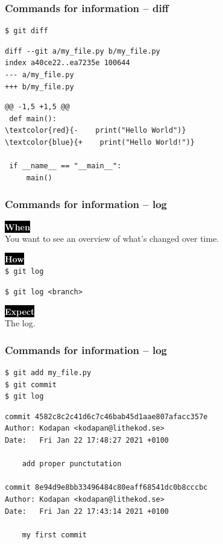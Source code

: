 \documentclass{beamer}
\newcommand{\keyword}[1]{\hspace{-1.0em}\colorbox{black}{\textcolor{white}{\textbf{#1}\vphantom{Ep}}}\vspace{0.2em}} %
\begin{document}
\begin{frame}[fragile]
  \frametitle{Commands for information -- diff}

\begin{verbatim}
$ git diff
\end{verbatim}
\pause{}
\vspace{-2.4ex}
{
\color{gray}
\begin{Verbatim}[commandchars=\\\{\}]
diff --git a/my_file.py b/my_file.py
index a40ce22..ea7235e 100644
--- a/my_file.py
+++ b/my_file.py
\end{Verbatim}
}
\pause{}
\begin{Verbatim}[commandchars=\\\{\}]
@@ -1,5 +1,5 @@
 def main():
\textcolor{red}{-    print("Hello World")}
\textcolor{blue}{+    print("Hello World!")}
 
 if __name__ == "__main__":
     main()
\end{Verbatim}
\end{frame}

\begin{frame}
  \frametitle{Commands for information -- log}

  \keyword{When}\\
  You want to see an overview of what's changed over time.
  \vspace{0.5em}

  \keyword{How}\\
  \texttt{\$ git log}

  \texttt{\$ git log <branch>}
  \vspace{0.5em}

  \keyword{Expect}\\
  The log.
\end{frame}

\begin{frame}[fragile]
  \frametitle{Commands for information -- log}
\begin{Verbatim}
$ git add my_file.py
$ git commit
$ git log
\end{Verbatim}
\pause{}
\vspace{-1.2ex} %
\begin{Verbatim}
commit 4582c8c2c41d6c7c46bab45d1aae807afacc357e
Author: Kodapan <kodapan@lithekod.se>
Date:   Fri Jan 22 17:48:27 2021 +0100

    add proper punctutation

commit 8e94d9e8bb33496484c80eaff68541dc0b8cccbc
Author: Kodapan <kodapan@lithekod.se>
Date:   Fri Jan 22 17:43:14 2021 +0100

    my first commit
\end{Verbatim}
\end{frame}
\end{document}
